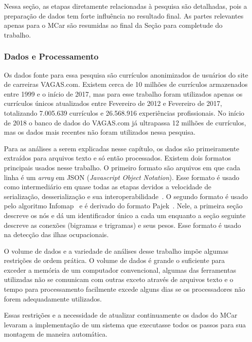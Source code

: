 \documentclass[12pt,a4paper]{article}
\begin{document}
Nessa seção, as etapas diretamente relacionadas à pesquisa são detalhadas, pois a preparação de dados tem forte influência no resultado final. As partes relevantes apenas para o MCar são resumidas ao final da Seção para completude do trabalho.


\subsubsection{Dados e Processamento}

Os dados fonte para essa pesquisa são currículos anonimizados de usuários do site de carreiras VAGAS.com. Existem cerca de 10 milhões de currículos armazenados entre 1999 e o início de 2017, mas para esse trabalho foram utilizados apenas os currículos únicos atualizados entre Fevereiro de 2012 e Fevereiro de 2017, totalizando 7.005.639 currículos e 26.568.916 experiências profissionais. No início de 2018 o banco de dados do VAGAS.com já ultrapassa 12 milhões de currículos, mas os dados mais recentes não foram utilizados nessa pesquisa.

Para as análises a serem explicadas nesse capítulo, os dados são primeiramente extraídos para arquivos texto e só então processados. Existem dois formatos principais usados nesse trabalho. O primeiro formato são arquivos em que cada linha é um \textit{array} em JSON (\textit{Javascript Object Notation}). Esse formato é usado como intermediário em quase todas as etapas devidos a velocidade de serialização, desserialização e sua interoperabilidade~\cite{Maeda2012-co}. O segundo formato é usado pelo algoritmo Infomap~\cite{Edler2012-hh} e é derivado do formato Pajek~\cite{Batagelj2002-ly}. Nele, a primeira seção descreve os nós e dá um identificador único a cada um enquanto a seção seguinte descreve as conexões (bigramas e trigramas) e seus pesos. Esse formato é usado na detecção das ilhas ocupacionais.

O volume de dados e a variedade de análises desse trabalho impõe algumas restrições de ordem prática. O volume de dados é grande o suficiente para exceder a memória de um computador convencional, algumas das ferramentas utilizadas não se comunicam com outras exceto através de arquivos texto e o tempo para processamento facilmente excede alguns dias se os processadores não forem adequadamente utilizados.

Essas restrições e a necessidade de atualizar continuamente os dados do MCar levaram a implementação de um sistema que executasse todos os passos para sua montagem de maneira automática.
\end{document}
